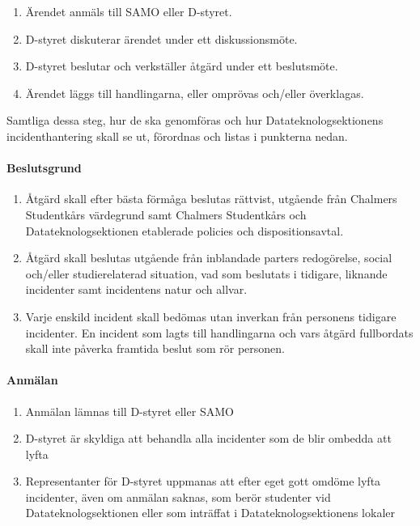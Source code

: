 \documentclass{dtek}
\begin{document}
\begin{enumerate}
  \item Ärendet anmäls till SAMO eller D-styret.
  \item D-styret diskuterar ärendet under ett diskussionsmöte.
  \item D-styret beslutar och verkställer åtgärd under ett beslutsmöte.
  \item Ärendet läggs till handlingarna, eller omprövas och/eller överklagas.
\end{enumerate}

Samtliga dessa steg, hur de ska genomföras och hur Datateknologsektionens
incidenthantering skall se ut, förordnas och listas i punkterna nedan.

\paragraph{Beslutsgrund}
\begin{enumerate}
  \item Åtgärd skall efter bästa förmåga beslutas rättvist, utgående från Chalmers Studentkårs värdegrund samt Chalmers Studentkårs och Datateknologsektionen etablerade policies och dispositionsavtal.
  \item Åtgärd skall beslutas utgående från inblandade parters redogörelse, social och/eller studierelaterad situation, vad som beslutats i tidigare, liknande incidenter samt incidentens natur och allvar.
  \item Varje enskild incident skall bedömas utan inverkan från personens tidigare incidenter. En incident som lagts till handlingarna och vars åtgärd fullbordats skall inte påverka framtida beslut som rör personen.
\end{enumerate}

\paragraph{Anmälan}
\begin{enumerate}[resume]
  \item Anmälan lämnas till D-styret eller SAMO
  \item D-styret är skyldiga att behandla alla incidenter som de blir ombedda att lyfta
  \item Representanter för D-styret uppmanas att efter eget gott omdöme lyfta incidenter, även om anmälan saknas, som berör studenter vid Datateknologsektionen eller som inträffat i Datateknologsektionens lokaler
\end{enumerate}
\end{document}
